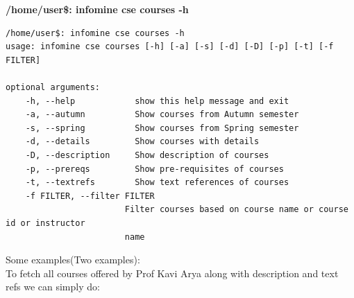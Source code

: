 \documentclass[12pt, a4paper]{article}
\begin{document}
\textbf{/home/user\$: infomine cse courses -h}\\
\begin{verbatim}
/home/user$: infomine cse courses -h
usage: infomine cse courses [-h] [-a] [-s] [-d] [-D] [-p] [-t] [-f FILTER]

optional arguments:
    -h, --help            show this help message and exit
    -a, --autumn          Show courses from Autumn semester
    -s, --spring          Show courses from Spring semester
    -d, --details         Show courses with details
    -D, --description     Show description of courses
    -p, --prereqs         Show pre-requisites of courses
    -t, --textrefs        Show text references of courses
    -f FILTER, --filter FILTER
                        Filter courses based on course name or course id or instructor
                        name
\end{verbatim}
Some examples(Two examples):\\
To fetch all courses offered by Prof Kavi Arya along with description and text refs we can simply do:
\end{document}
